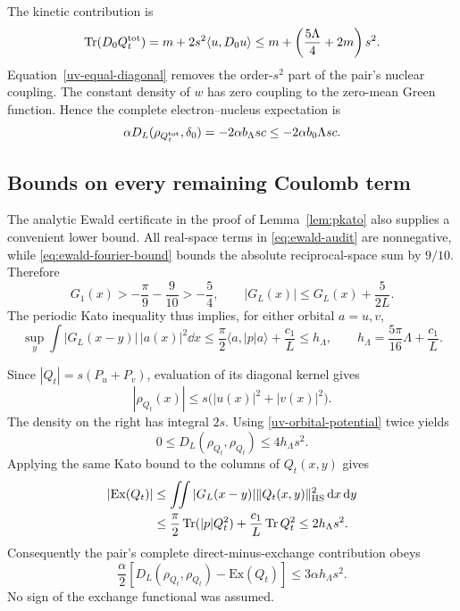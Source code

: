 The kinetic contribution is
\begin{equation}
 \operatorname{Tr}(D_0Q^{\rm tot}_t)
 =m+2s^2\langle u,D_0u\rangle
 \le m+\left(\frac{5\Lambda}4+2m\right)s^2.
 \label{uv-kinetic}
\end{equation}
Equation~\eqref{uv-equal-diagonal} removes the order-$s^2$ part of the
pair's nuclear coupling.  The constant density of $w$ has zero coupling
to the zero-mean Green function.  Hence the complete electron--nucleus
expectation is
\begin{equation}
 \alpha D_L(\rho_{Q^{\rm tot}_t},\delta_0)
 =-2\alpha b_\Lambda sc
 \le-2\alpha b_0\Lambda sc.
 \label{uv-nuclear-attraction}
\end{equation}

\subsection{Bounds on every remaining Coulomb term}
\label{uv-coulomb}

The analytic Ewald certificate in the proof of Lemma~\ref{lem:pkato}
also supplies a convenient lower bound.  All real-space terms in
\eqref{eq:ewald-audit} are nonnegative, while
\eqref{eq:ewald-fourier-bound} bounds the absolute reciprocal-space sum
by $9/10$.  Therefore
\[
 G_1(x)>-\frac\pi9-\frac9{10}>-\frac54,
 \qquad |G_L(x)|\le G_L(x)+\frac5{2L}.
\]
The periodic Kato inequality thus implies, for either orbital $a=u,v$,
\begin{equation}
 \sup_y\int |G_L(x-y)|\,|a(x)|^2\dd x
 \le\frac\pi2\langle a,|p|a\rangle+\frac{c_1}{L}
 \le h_\Lambda,
 \qquad h_\Lambda=\frac{5\pi}{16}\Lambda+\frac{c_1}{L}.
 \label{uv-orbital-potential}
\end{equation}

Since $|Q_t|=s(P_u+P_v)$, evaluation of its diagonal kernel gives
\[
 |\rho_{Q_t}(x)|\le s\bigl(|u(x)|^2+|v(x)|^2\bigr).
\]
The density on the right has integral $2s$.  Using
\eqref{uv-orbital-potential} twice yields
\begin{equation}
 0\le D_L(\rho_{Q_t},\rho_{Q_t})\le4h_\Lambda s^2.
 \label{uv-direct}
\end{equation}
Applying the same Kato bound to the columns of $Q_t(x,y)$ gives
\begin{align}
 |\mathrm{Ex}(Q_t)|
 &\le\iint |G_L(x-y)|\|Q_t(x,y)\|_{\mathrm{HS}}^2\,\mathrm d x\,\mathrm d y\nonumber\\
 &\le\frac\pi2\operatorname{Tr}(|p|Q_t^2)+\frac{c_1}{L}\operatorname{Tr} Q_t^2
 \le2h_\Lambda s^2.
 \label{uv-exchange}
\end{align}
Consequently the pair's complete direct-minus-exchange contribution obeys
\begin{equation}
 \frac\alpha2\left[D_L(\rho_{Q_t},\rho_{Q_t})
                       -\mathrm{Ex}(Q_t)\right]
 \le3\alpha h_\Lambda s^2.
 \label{uv-pair-interaction}
\end{equation}
No sign of the exchange functional was assumed.

